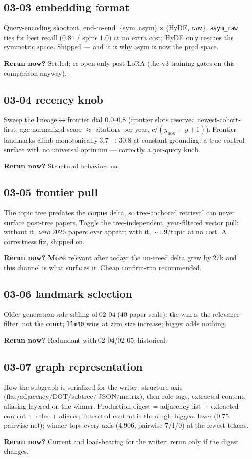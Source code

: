 \documentclass[10pt]{article}
\newcommand{\rerun}[1]{\par\smallskip\noindent\textbf{Rerun now?} #1}
\begin{document}
\subsection*{03-03 embedding format}
Query-encoding shootout, end-to-end: $\{$sym, asym$\}\times\{$HyDE, raw$\}$. \texttt{asym\_raw}
ties for best recall ($0.81$ / spine $1.0$) at no extra cost; HyDE only rescues the symmetric
space. Shipped --- and it is why asym is now the prod space.
\rerun{Settled; re-open only post-LoRA (the v3 training gates on this comparison anyway).}

\subsection*{03-04 recency knob}
Sweep the lineage$\leftrightarrow$frontier dial $0.0$--$0.8$ (frontier slots reserved
newest-cohort-first; age-normalized score $\approx$ citations per year,
$c/(y_{\mathrm{now}}-y+1)$). Frontier landmarks climb monotonically $3.7\to30.8$ at constant
grounding: a true control surface with no universal optimum --- correctly a per-query knob.
\rerun{Structural behavior; no.}

\subsection*{03-05 frontier pull}
The topic tree predates the corpus delta, so tree-anchored retrieval can never surface post-tree
papers. Toggle the tree-independent, year-filtered vector pull: without it, \emph{zero} 2026
papers ever appear; with it, ${\sim}1.9$/topic at no cost. A correctness fix, shipped on.
\rerun{\textbf{More} relevant after today: the un-treed delta grew by 27k and this channel is
what surfaces it. Cheap confirm-run recommended.}

\subsection*{03-06 landmark selection}
Older generation-side sibling of 02-04 (40-paper scale): the win is the relevance filter, not
the count; \texttt{llm40} wins at zero size increase; bigger adds nothing.
\rerun{Redundant with 02-04/02-05; historical.}

\subsection*{03-07 graph representation}
How the subgraph is serialized for the writer: structure axis (flat/adjacency/DOT/subtree/
JSON/matrix), then role tags, extracted content, aliasing layered on the winner. Production
digest = adjacency list + extracted content + roles + aliases; extracted content is the single
biggest lever ($0.75$ pairwise net); winner tops every axis (4.906, pairwise 7/1/0) at the
fewest tokens.
\rerun{Current and load-bearing for the writer; rerun only if the digest changes.}
\end{document}

